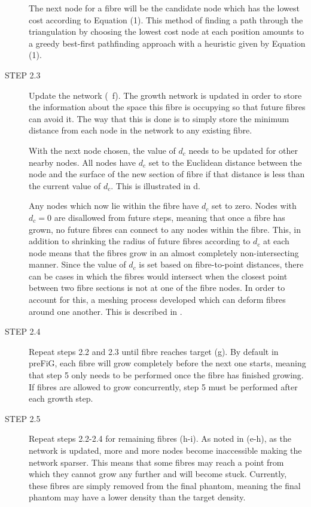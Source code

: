 \begin{description}
The next node for a fibre will be the candidate node which has the lowest cost according to Equation (1). This method of finding a path through the triangulation by choosing the lowest cost node at each position amounts to a greedy best-first pathfinding approach with a heuristic given by Equation (1).

  \item [STEP 2.3] Update the network (~f). The growth network is updated in order to store the information about the space this fibre is occupying so that future fibres can avoid it. The way that this is done is to simply store the minimum distance from each node in the network to any existing fibre.

With the next node chosen, the value of $d_c$ needs to be updated for other nearby nodes.
All nodes have $d_c$ set to the Euclidean distance between the node and the surface of the new section of fibre if that distance is less than the current value of $d_c$. This is illustrated in d.

Any nodes which now lie within the fibre have $d_c$ set to zero.
Nodes with $d_c = 0$ are disallowed from future steps, meaning that once a fibre has grown, no future fibres can connect to any nodes within the fibre.
This, in addition to shrinking the radius of future fibres according to $d_c$ at each node means that the fibres grow in an almost completely  non-intersecting manner.
Since the value of $d_c$ is set based on fibre-to-point distances, there can be cases in which the fibres would intersect when the closest point between two fibre sections is not at one of the fibre nodes.
In order to account for this, a meshing process developed which can deform fibres around one another. This is described in .

  \item [STEP 2.4] Repeat steps 2.2 and 2.3 until fibre reaches target (g). By default in \ac{preFiG}, each fibre will grow completely before the next one starts, meaning that step 5 only needs to be performed once the fibre has finished growing. If fibres are allowed to grow concurrently, step 5 must be performed after each growth step.

  \item [STEP 2.5] Repeat steps 2.2-2.4 for remaining fibres (h-i). As noted in  (e-h), as the network is updated, more and more nodes become inaccessible making the network sparser. This means that some fibres may reach a point from which they cannot grow any further and will become stuck. Currently, these fibres are simply removed from the final phantom, meaning the final phantom may have a lower density than the target density.
\end{description}



